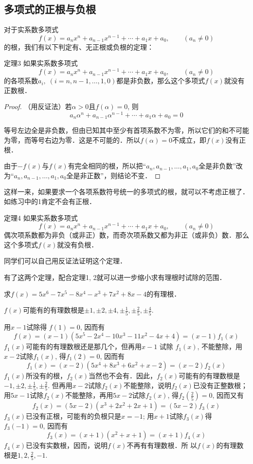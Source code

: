 \subsection{多项式的正根与负根}

对于实系数多项式
\[f(x)=a_nx^n+a_{n-1}x^{n-1}+\cdots+a_1x+a_0,\qquad (a_n\ne 0)\]
的根，我们有以下判定有、无正根或负根的定理：

\begin{blk}{定理3}
    如果实系数多项式
    \[f(x)=a_nx^n+a_{n-1}x^{n-1}+\cdots+a_1x+a_0,\qquad (a_n\ne 0)\]
    的各项系数$a_i,\; (i=n,n-1,\ldots,1, 0)$都是非负数，那么这个多项式$f(x)$就没有正数根．
\end{blk}

\begin{proof}
（用反证法）若$\alpha>0$且$f(\alpha)=0$, 则
\[a_n\alpha^n+a_{n-1}\alpha^{n-1}+\cdots+a_1\alpha+a_0=0\]

等号左边全是非负数，但由已知其中至少有首项系数不为零，所以它们的和不可能为零，而等号右边为零．这是不可能的．所以$f(\alpha)=0$不成立，即$f(x)$没有正根．

由于$-f(x)$与$f(x)$有完全相同的根，所以把“$a_n,a_{n-1},\ldots,a_1,a_0$全是非负数”改为“$a_n,a_{n-1},\ldots,a_1,a_0$全是非正数”，则结论不变．
\end{proof}

这样一来，如果要求一个各项系数符号统一的多项式的根，就可以不考虑正根了．如练习中的1肯定不会有正根．

\begin{blk}{定理4}
     如果实系数多项式
 \[f(x)=a_nx^n+a_{n-1}x^{n-1}+\cdots+a_1x+a_0,\qquad (a_n\ne 0)\]
偶次项系数都为非负（或非正）数，而奇次项系数又都为非正（或非负）数．那么这个多项式$f(x)$就没有负根．
\end{blk}

同学们可以自己用反证法证明这个定理．

有了这两个定理，配合定理1, 2就可以进一步缩小求有理根时试除的范围．

\begin{example}
    求$f(x)=5x^6-7x^5-8x^4-x^3+7x^2+8x-4$的有理根．
\end{example}

\begin{solution}
$f(x)$可能有的有理数根是$\pm 1,\pm 2,\pm 4,\pm \frac{1}{5},
\pm \frac{2}{5}, \pm \frac{4}{5}$.

用$x-1$试除得 $f(1)=0$, 因而有
\[f (x) = (x-1) (5x^5-2x^4-10x^3-11x^2-4x+4)=(x-1) f_1(x)\]
$f_1(x)$可能有的有理数根还是那几个，但再用$x-1$ 试除
$f_1(x)$, 不能整除，用$x-2$试除$f_1(x)$, 得$f_1(2)=0$, 因而有
\[f_1 (x) = (x-2) (5x^4+8x^3+6x^2+x-2)=(x-2)f_2(x)\]
$f_1(x)$所没有的根，$f_2(x)$当然也不会有．因此，$f_2(x)$可能有的有理数根是$-1,\pm 2,\pm \frac{1}{5},\pm \frac{2}{5}$. 但再用$x-2$试除$f_2(x)$不能整除，说明$f_2(x)$已没有正整数根；用$5x-1$试除$f_2(x)$不能整除，再用$5x-2$试除$f_2(x)$, 得$f_2\left(\frac{2}{5}\right)=0$, 
因而又有
\[f_2 (x) = (5x-2) (x^3+2x^2+2x+1)=(5x-2)f_3(x)\]
$f_3(x)$已没有正根，可能有的负根只是$x=-1$; 用$x+1$试除$f_3(x)$得$f_3(-1)=0$, 因而有
\[f_3 (x) = (x+1) (x^2+x+1)=(x+1)f_4(x)\]
$f_4(x)$已没有实数根，因而，说明$f(x)$不再有有理数根．所
以$f(x)$的有理数根是$1, 2,\frac{2}{5},-1$.
\end{solution}

